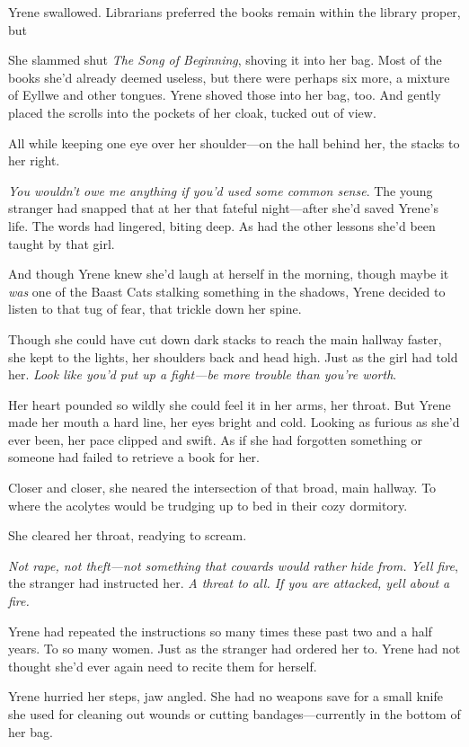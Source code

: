 Yrene swallowed.
Librarians preferred the books remain within the library proper, but 

She slammed shut \emph{The Song of Beginning}, shoving it into her bag.
Most of the books she'd already deemed useless, but there were perhaps six more, a mixture of Eyllwe and other tongues.
Yrene shoved those into her bag, too.
And gently placed the scrolls into the pockets of her cloak, tucked out of view.

All while keeping one eye over her shoulder---on the hall behind her, the stacks to her right.

\emph{You wouldn't owe me anything if you'd used some common sense}.
The young stranger had snapped that at her that fateful night---after she'd saved Yrene's life.
The words had lingered, biting deep.
As had the other lessons she'd been taught by that girl.

And though Yrene knew she'd laugh at herself in the morning, though maybe it \emph{was} one of the Baast Cats stalking something in the shadows, Yrene decided to listen to that tug of fear, that trickle down her spine.

Though she could have cut down dark stacks to reach the main hallway faster, she kept to the lights, her shoulders back and head high.
Just as the girl had told her.
\emph{Look like you'd put up a fight---be more trouble than you're worth}.

Her heart pounded so wildly she could feel it in her arms, her throat.
But Yrene made her mouth a hard line, her eyes bright and cold.
Looking as furious as she'd ever been, her pace clipped and swift.
As if she had forgotten something or someone had failed to retrieve a book for her.

Closer and closer, she neared the intersection of that broad, main hallway.
To where the acolytes would be trudging up to bed in their cozy dormitory.

She cleared her throat, readying to scream.

\emph{Not rape, not theft---not something that cowards would rather hide from.
Yell fire}, the stranger had instructed her.
\emph{A threat to all.
If you are attacked, yell about a fire.}

Yrene had repeated the instructions so many times these past two and a half years.
To so many women.
Just as the stranger had ordered her to.
Yrene had not thought she'd ever again need to recite them for herself.

Yrene hurried her steps, jaw angled.
She had no weapons save for a small knife she used for cleaning out wounds or cutting bandages---currently in the bottom of her bag.

